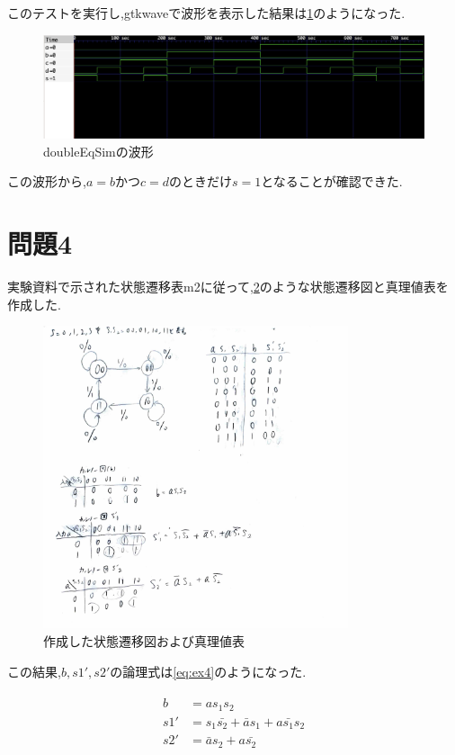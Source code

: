 \documentclass[autodetect-engine, dvi=dvipdfmx, 10pt, a4paper, ja=standard]{bxjsarticle}
\begin{document}
このテストを実行し,gtkwaveで波形を表示した結果は\ref{fig:ex3}のようになった.

\begin{figure}[H]
	\centering
	\includegraphics[width=\textwidth]{ex3.png}
	\caption{doubleEqSimの波形}
	\label{fig:ex3}
\end{figure}

この波形から,$a=b$かつ$c=d$のときだけ$s=1$となることが確認できた.

\section{問題4}

実験資料で示された状態遷移表m2に従って,\ref{fig:ex4}のような状態遷移図と真理値表を作成した.

\begin{figure}[H]
	\centering
	\includegraphics[width=0.8\textwidth]{ex4.jpeg}
	\caption{作成した状態遷移図および真理値表}
	\label{fig:ex4}
\end{figure}

この結果,$b, s1', s2'$の論理式は\ref{eq:ex4}のようになった.

\begin{align}
	\label{eq:ex4}
	\begin{split}
		b   & = a s_1 s_2                                     \\
		s1' & = s_1 \bar{s_2} + \bar{a} s_1 + a \bar{s_1} s_2 \\
		s2' & = \bar{a} s_2 + a \bar{s_2}
	\end{split}
\end{align}
\end{document}
